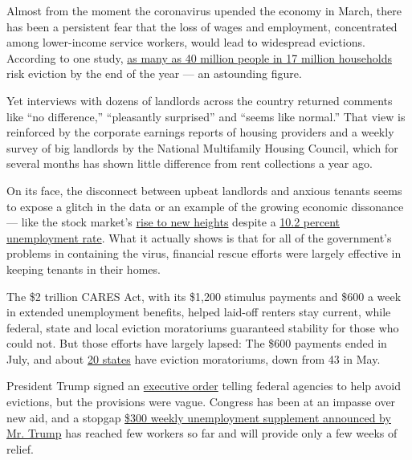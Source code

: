 Almost from the moment the coronavirus upended the economy in March,
there has been a persistent fear that the loss of wages and employment,
concentrated among lower-income service workers, would lead to
widespread evictions. According to one study,
\href{https://nlihc.org/sites/default/files/The_Eviction_Crisis_080720.pdf}{as
many as 40 million people in 17 million households} risk eviction by the
end of the year --- an astounding figure.

Yet interviews with dozens of landlords across the country returned
comments like ``no difference,'' ``pleasantly surprised'' and ``seems
like normal.'' That view is reinforced by the corporate earnings reports
of housing providers and a weekly survey of big landlords by the
National Multifamily Housing Council, which for several months has shown
little difference from rent collections a year ago.

On its face, the disconnect between upbeat landlords and anxious tenants
seems to expose a glitch in the data or an example of the growing
economic dissonance --- like the stock market's
\href{https://www.nytimes3xbfgragh.onion/2020/08/18/business/stock-market-record.html}{rise
to new heights} despite a
\href{https://www.bls.gov/news.release/pdf/empsit.pdf}{10.2 percent
unemployment rate}. What it actually shows is that for all of the
government's problems in containing the virus, financial rescue efforts
were largely effective in keeping tenants in their homes.

The \$2 trillion CARES Act, with its \$1,200 stimulus payments and \$600
a week in extended unemployment benefits, helped laid-off renters stay
current, while federal, state and local eviction moratoriums guaranteed
stability for those who could not. But those efforts have largely
lapsed: The \$600 payments ended in July, and about
\href{https://docs.google.com/spreadsheets/u/1/d/e/2PACX-1vTH8dUIbfnt3X52TrY3dEHQCAm60e5nqo0Rn1rNCf15dPGeXxM9QN9UdxUfEjxwvfTKzbCbZxJMdR7X/pubhtml?urp=gmail_link}{20
states} have eviction moratoriums, down from 43 in May.

President Trump signed an
\href{https://www.nytimes3xbfgragh.onion/2020/08/09/business/trump-executive-orders-unemployment.html}{executive
order} telling federal agencies to help avoid evictions, but the
provisions were vague. Congress has been at an impasse over new aid, and
a stopgap
\href{https://www.nytimes3xbfgragh.onion/2020/08/13/business/economy/unemployment-benefits-coronavirus.html}{\$300
weekly unemployment supplement announced by Mr. Trump} has reached few
workers so far and will provide only a few weeks of relief.

